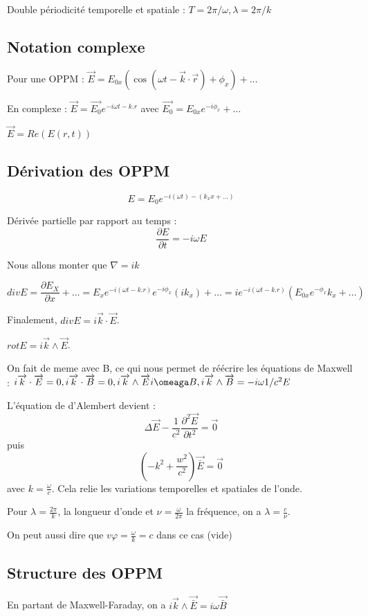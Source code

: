 \documentclass[french]{yLectureNote}
\renewcommand{\vec}{\overrightarrow}
\begin{document}
Double périodicité temporelle et spatiale : $T = 2\pi/\omega, \lambda = 2\pi/k$

\subsection{Notation complexe}
Pour une OPPM : $\vec{E} = E_{0x} (\cos(\omega t-\vec{k}\cdot \vec{r})+\phi_x)+\dots$

En complexe : $\vec{E} = \vec{E_0}e^{-i\omega t - k.r}$ avec $\vec{E_0} = E_{0x}e^{-i\phi_x}+\dots$

$\vec{E} = Re(E(r,t))$
\subsection{Dérivation des OPPM}
$$E = E_0 e^{-i(\omega t)-(k_x x +\dots)}$$

Dérivée partielle par rapport au temps : 
$$\frac{\partial E}{\partial t} = -i\omega E$$

Nous allons monter que $\nabla = ik$

$$div E = \frac{\partial E_X}{\partial x} + \dots = E_x e^{-i(\omega t-k.r)}e^{-i\phi_x}(ik_x)+\dots = ie^{-i(\omega t-k.r)}(E_{0x}e^{-\phi_x}k_x+\dots)$$

Finalement, $div E = i\vec{k}\cdot \vec{E}$.

$rot E = i\vec{k}\wedge \vec{E}$.

On fait de meme avec B, ce qui nous permet de réécrire les équations de Maxwell : $i\vec{k}\cdot \vec{E} = 0, i\vec{k}\cdot \vec{B} = 0, i\vec{k}\wedge \vec{E}i\omeaga B, i\vec{k}\wedge \vec{B} = -i\omega 1/c^2 E$

L'équation de d'Alembert devient :
$$\Delta \vec{E} - \frac{1}{c^2}\frac{\partial^2 \vec{E}}{\partial t^2} = \vec{0}$$
puis 
$$ (-k^2 + \frac{w^2}{c^2})\vec{\bar{E}} = \vec{0}$$ avec $k = \frac{\omega}{c}$. Cela relie les variations temporelles et spatiales de l'onde. 

Pour $\lambda = \frac{2\pi}{k}$, la longueur d'onde et $\nu = \frac{\omega}{2\pi}$ la fréquence, on a $\lambda = \frac{c}{\nu}$.

On peut aussi dire que $v\varphi = \frac{\omega}{k} = c$ dans ce cas (vide)

\subsection{Structure des OPPM}
En partant de Maxwell-Faraday, on a $i\vec{k} \wedge \vec{\bar{E}} = i\omega \vec{\bar{B}}$
\end{document}
